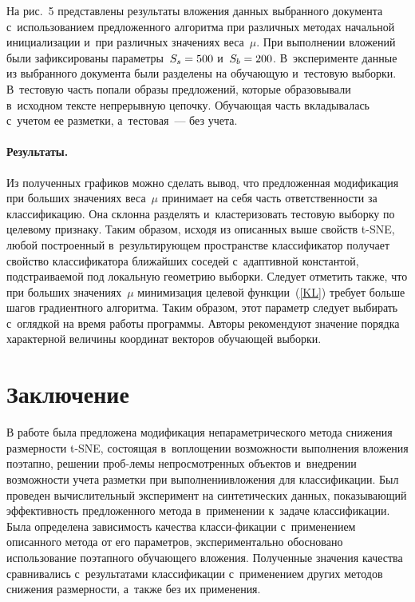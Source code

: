 \begin{multicols}{2}
На рис.~5
представлены результаты вложения данных выбранного документа с~использованием 
предложенного алгоритма при различных методах начальной инициализации и~при 
различных значениях веса~$\mu$. При выполнении вложений были зафиксированы 
параметры~$S_s \hm= 500$ и~$S_b \hm= 200$. 
В~эксперименте данные из выбранного документа были разделены на обучающую и~тестовую 
выборки. В~тестовую часть попали образы предложений, которые образовывали в~исходном 
тексте непрерывную цепочку. Обучающая часть вкладывалась с~учетом ее 
разметки, а~тестовая~--- без учета.






\vspace*{-7pt}

\paragraph*{Результаты.}
Из полученных графиков можно сделать вывод, что предложенная модификация 
при больших значениях веса~$\mu$ принимает на себя часть ответственности 
за классификацию. Она склонна разделять и~кластеризовать тестовую выборку 
по целевому признаку. Таким образом, исходя из описанных выше свойств t-SNE, 
любой построенный в~результирующем пространстве классификатор получает 
свойство классификатора ближайших соседей с~адаптивной константой, 
подстраиваемой под локальную геометрию выборки.
Следует отметить также, что при больших значениях~$\mu$ минимизация целевой 
функции~(\ref{KL}) требует больше шагов градиентного алгоритма. Таким образом, 
этот параметр следует выбирать с~оглядкой на время работы программы. 
Авторы рекомендуют значение порядка характерной величины координат 
векторов обучающей выборки.

\vspace*{-8pt}

\section{Заключение}

\vspace*{-2pt}

В работе была предложена модификация непараметрического метода 
снижения размерности t-SNE, состоящая в~воплощении возможности\linebreak 
выполнения вложения поэтапно, решении проб-\linebreak лемы непросмотренных объектов и~внедрении 
возмож\-ности учета разметки при выполнении\linebreak вложения для классификации. Был проведен 
вычислительный эксперимент на синтетических данных, показывающий эффективность 
предложенного метода в~применении к~задаче классификации.
 Была определена зависимость 
качества класси-\linebreak фикации с~применением описанного метода от его па\-ра\-мет\-ров,
экспериментально обосновано использование поэтапного обучающего вложения. 
Полученные зна\-че\-ния качества сравнивались с~результатами классификации с~применением 
других методов снижения размерности, а~также без их применения.


\end{multicols}
